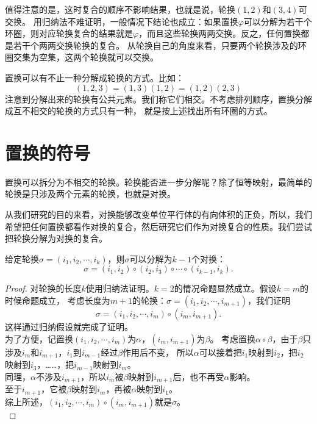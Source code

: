 \documentclass[12pt,UTF8,fontset=none]{ctexbook}
\begin{document}
值得注意的是，这时复合的顺序不影响结果，也就是说，轮换$(1, 2)$和$(3, 4)$可交换。
用归纳法不难证明，一般情况下结论也成立：如果置换$\varphi$可以分解为若干个环圈，则对应轮换复合的结果就是$\varphi$，而且这些轮换两两交换。反之，任何置换都是若干个两两交换轮换的复合。
从轮换自己的角度来看，只要两个轮换涉及的环圈交集为空集，这两个轮换就可以交换。

置换可以有不止一种分解成轮换的方式。比如：
$$(1,2,3) = (1,3)(1,2) = (1,2)(2,3)$$
注意到分解出来的轮换有公共元素。我们称它们相交。不考虑排列顺序，置换分解成互不相交的轮换的方式只有一种，
就是按上述找出所有环圈的方式。

\section{置换的符号}
置换可以拆分为不相交的轮换。轮换能否进一步分解呢？除了恒等映射，最简单的轮换是只涉及两个元素的轮换，也就是对换。

从我们研究的目的来看，对换能够改变单位平行体的有向体积的正负，所以，我们希望把任何置换都看作对换的复合，然后研究它们作为对换复合的性质。我们尝试把轮换分解为对换的复合。
\begin{pp}\label{pp:10_5}
    给定轮换$\sigma = (i_1, i_2, \cdots, i_k)$，则$\sigma$可以分解为$k-1$个对换：
    $$ \sigma = (i_1, i_2) \circ (i_2, i_3) \circ \cdots \circ (i_{k-1}, i_k). $$
\end{pp}
\begin{proof} %
    对轮换的长度$k$使用归纳法证明。$k=2$的情况命题显然成立。假设$k=m$的时候命题成立，
    考虑长度为$m+1$的轮换：$\sigma = (i_1, i_2, \cdots, i_{m+1})$，我们证明
    $$ \sigma = (i_1, i_2, \cdots, i_m) \circ (i_m, i_{m+1}).$$
    这样通过归纳假设就完成了证明。\\
    为了方便，记置换$(i_1, i_2, \cdots, i_m)$为$\alpha$，$(i_m, i_{m+1})$为$\beta$。
    考虑置换$\alpha \circ \beta$，由于$\beta$只涉及$i_m$和$i_{m+1}$，$i_1$到$i_{m-1}$经过$\beta$作用后不变，
    所以$\alpha$可以接着把$i_1$映射到$i_2$，把$i_2$映射到$i_3$，……，把$i_{m-1}$映射到$i_{m}$。\\
    同理，$\alpha$不涉及$i_{m+1}$，所以$i_m$被$\beta$映射到$i_{m+1}$后，也不再受$\alpha$影响。\\
    至于$i_{m+1}$，它被$\beta$映射到$i_m$，再被$\alpha$映射到$i_1$。\\
    综上所述，$(i_1, i_2, \cdots, i_m) \circ (i_m, i_{m+1})$就是$\sigma$。\\
\end{proof}
\end{document}
